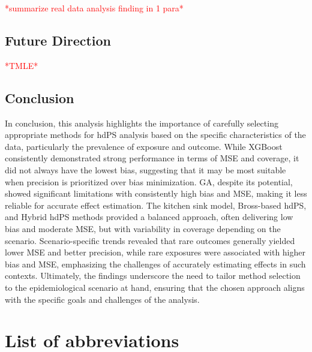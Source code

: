 \documentclass[sn-vancouver,Numbered,lineno,pdflatex]{sn-jnl}
\begin{document}
\textcolor{red}{*summarize real data analysis finding in 1 para*}

\subsection{Future Direction}\label{future-direction}

\textcolor{red}{*TMLE*}

\subsection{Conclusion}\label{conclusion}

In conclusion, this analysis highlights the importance of carefully
selecting appropriate methods for hdPS analysis based on the specific
characteristics of the data, particularly the prevalence of exposure and
outcome. While XGBoost consistently demonstrated strong performance in
terms of MSE and coverage, it did not always have the lowest bias,
suggesting that it may be most suitable when precision is prioritized
over bias minimization. GA, despite its potential, showed significant
limitations with consistently high bias and MSE, making it less reliable
for accurate effect estimation. The kitchen sink model, Bross-based
hdPS, and Hybrid hdPS methods provided a balanced approach, often
delivering low bias and moderate MSE, but with variability in coverage
depending on the scenario. Scenario-specific trends revealed that rare
outcomes generally yielded lower MSE and better precision, while rare
exposures were associated with higher bias and MSE, emphasizing the
challenges of accurately estimating effects in such contexts.
Ultimately, the findings underscore the need to tailor method selection
to the epidemiological scenario at hand, ensuring that the chosen
approach aligns with the specific goals and challenges of the analysis.

\section*{List of abbreviations}\label{list-of-abbreviations}
\end{document}
